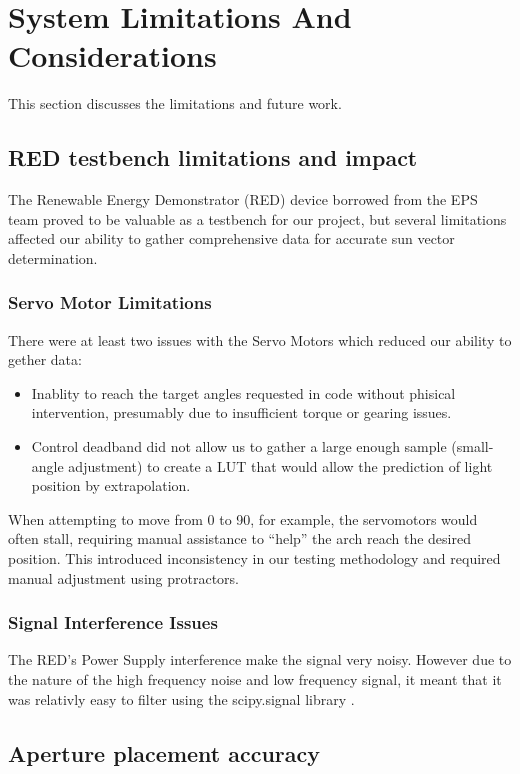 \section{System Limitations And Considerations}
This section discusses the limitations and future work.
\subsection{\acf{RED} testbench limitations and impact}
The Renewable Energy Demonstrator (RED) device borrowed from the EPS team \cite{RefWorks:shopov2022renewable} proved to be valuable as a testbench for our project, but several limitations affected our ability to gather comprehensive data for accurate sun vector determination.
\subsubsection{Servo Motor Limitations}
There were at least two issues with the Servo Motors which reduced our ability to gether data:
\begin{itemize}
    \item Inablity to reach the target angles requested in code without phisical intervention, presumably due to insufficient torque or gearing issues.
    \item Control deadband did not allow us to gather a large enough sample (small-angle adjustment) to create a \ac{LUT} that would allow the prediction of light position by extrapolation.
\end{itemize}

When attempting to move from 0\textdegree{} to 90\textdegree{}, for example, the servomotors would often stall, requiring manual assistance to ``help'' the arch reach the desired position. This introduced inconsistency in our testing methodology and required manual adjustment using protractors.

\subsubsection{Signal Interference Issues}

The \ac{RED}'s Power Supply interference make the signal very noisy. However due to the nature of the high frequency noise and low frequency signal, it meant that it was relativly easy to filter using the scipy.signal library \cite{RefWorks:butter}.

\subsection{Aperture placement accuracy}

